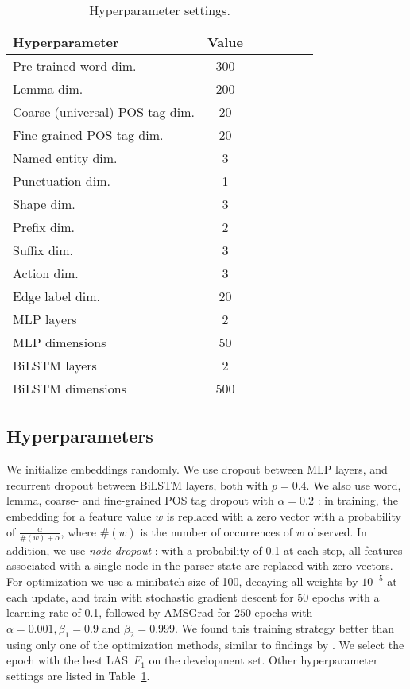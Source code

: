 \documentclass[11pt,a4paper]{article}
\begin{document}
\begin{table}[h]
\centering
\begin{tabular}{l|c|ccccc}
\hline
\bf Hyperparameter &  \bf Value \\
\hline
Pre-trained word dim. & 300 \\
Lemma dim. & 200 \\
Coarse (universal) POS tag dim. & 20 \\
Fine-grained POS tag dim. & 20 \\
Named entity dim. & 3 \\
Punctuation dim. & 1 \\
Shape dim. & 3 \\
Prefix dim. & 2 \\
Suffix dim. & 3 \\
Action dim. & 3 \\
Edge label dim. & 20 \\
\hline
MLP layers & 2 \\
MLP dimensions & 50 \\
BiLSTM layers & 2 & \\
BiLSTM dimensions & 500
\end{tabular}
\caption{Hyperparameter settings.\label{tab:hyperparams}}
\end{table}


\subsection{Hyperparameters}

We initialize embeddings randomly.
We use dropout \cite{srivastava2014dropout} between MLP layers, and recurrent dropout
\cite{NIPS2016_6241} between BiLSTM layers, both with $p=0.4$.
We also use word, lemma, coarse- and fine-grained POS tag dropout
with $\alpha=0.2$
\cite{kiperwasser2016simple}: in training, the embedding for a feature value
$w$ is replaced with a zero vector with a probability of
$\frac{\alpha}{\#(w)+\alpha}$,
where $\#(w)$ is the number of occurrences of $w$ observed.
In addition, we use \textit{node dropout} \cite{hershcovich2018multitask}:
with a probability of 0.1 at each step, all features associated with a single
node in the parser state are replaced with zero vectors.
For optimization we use a minibatch size of 100, decaying all weights by $10^{-5}$ at each update,
and train with stochastic gradient descent for $50$ epochs with a learning
rate of 0.1, followed by AMSGrad \cite{j.2018on} for $250$ epochs with
$\alpha=0.001,\beta_1=0.9$ and $\beta_2=0.999$.
We found this training strategy better than using only one of the optimization methods,
similar to findings by \citet{keskar2017improving}.
We select the epoch with the best LAS~$F_1$ on the
development set.
Other hyperparameter settings are listed in Table~\ref{tab:hyperparams}.
\end{document}
